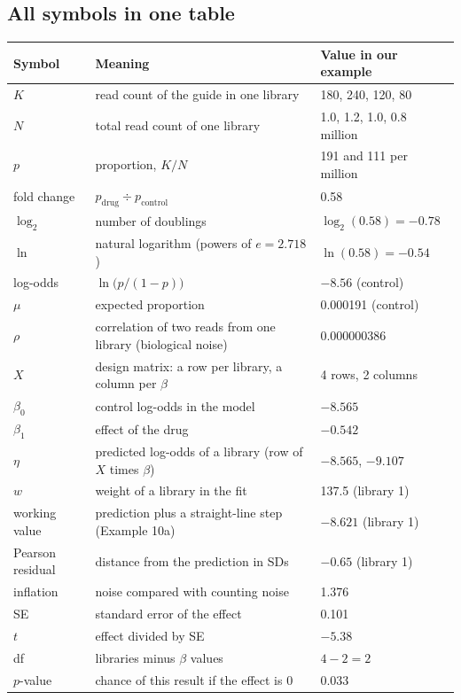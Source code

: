 \subsection*{All symbols in one table}

\begin{center}
\small
\begin{tabular}{@{}l p{6.3cm} l@{}}
\toprule
Symbol & Meaning & Value in our example\\
\midrule
$K$ & read count of the guide in one library & 180, 240, 120, 80\\
$N$ & total read count of one library & 1.0, 1.2, 1.0, 0.8 million\\
$p$ & proportion, $K/N$ & 191 and 111 per million\\
fold change & $p_{\text{drug}} \div p_{\text{control}}$ & 0.58\\
$\log_2$ & number of doublings & $\log_2(0.58) = -0.78$\\
$\ln$ & natural logarithm (powers of $e = 2.718$) & $\ln(0.58) = -0.54$\\
log-odds & $\ln\bigl(p/(1-p)\bigr)$ & $-8.56$ (control)\\
$\mu$ & expected proportion & 0.000191 (control)\\
$\rho$ & correlation of two reads from one library (biological noise) & 0.000000386\\
$X$ & design matrix: a row per library, a column per $\beta$ & 4 rows, 2 columns\\
$\beta_0$ & control log-odds in the model & $-8.565$\\
$\beta_1$ & effect of the drug & $-0.542$\\
$\eta$ & predicted log-odds of a library (row of $X$ times $\beta$) & $-8.565$, $-9.107$\\
$w$ & weight of a library in the fit & 137.5 (library 1)\\
working value & prediction plus a straight-line step (Example 10a) & $-8.621$ (library 1)\\
Pearson residual & distance from the prediction in SDs & $-0.65$ (library 1)\\
inflation & noise compared with counting noise & 1.376\\
SE & standard error of the effect & 0.101\\
$t$ & effect divided by SE & $-5.38$\\
df & libraries minus $\beta$ values & $4 - 2 = 2$\\
$p$-value & chance of this result if the effect is 0 & 0.033\\

\end{tabular}
\end{center}
